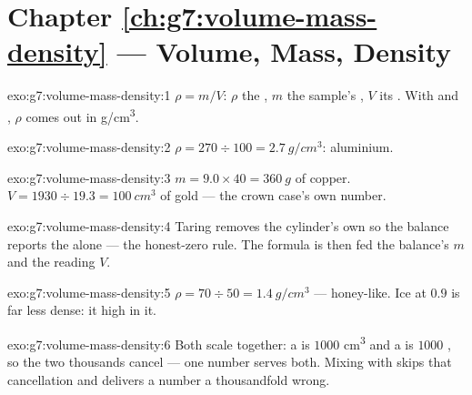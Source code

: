 \section*{Chapter \ref{ch:g7:volume-mass-density} --- Volume, Mass, Density}

\begin{solution}{exo:g7:volume-mass-density:1}
$\rho = m/V$: $\rho$ the , $m$ the sample's , $V$ its
. With  and , $\rho$ comes out in
\unit{g/cm^3}.
\end{solution}

\begin{solution}{exo:g7:volume-mass-density:2}
$\rho = 270 \div 100 = \qty{2.7}{g/cm^3}$: aluminium.
\end{solution}

\begin{solution}{exo:g7:volume-mass-density:3}
$m = 9.0 \times 40 = \qty{360}{g}$ of copper.
$V = 1930 \div 19.3 = \qty{100}{cm^3}$ of gold --- the crown
case's own number.
\end{solution}

\begin{solution}{exo:g7:volume-mass-density:4}
Taring removes the cylinder's own  so the balance reports the
 alone --- the honest-zero rule. The formula is then fed
the balance's  $m$ and the  reading $V$.
\end{solution}

\begin{solution}{exo:g7:volume-mass-density:5}
$\rho = 70 \div 50 = \qty{1.4}{g/cm^3}$ --- honey-like. Ice at
$0.9$ is far less dense: it  high in it.
\end{solution}

\begin{solution}{exo:g7:volume-mass-density:6}
Both  scale together: a  is $1000$ \unit{cm^3} and a
 is $1000$ , so the two thousands cancel --- one
number serves both. Mixing  with  skips that
cancellation and delivers a number a thousandfold wrong.
\end{solution}

